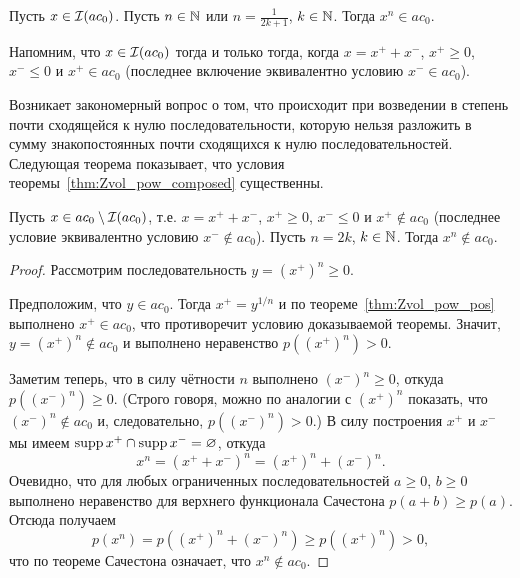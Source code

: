 \begin{theorem}
	\label{thm:Zvol_pow_composed}
	Пусть $x\in \mathcal{I}(ac_0)$.
	Пусть $n\in\mathbb{N}$ или $n = \frac1{2k+1}$, $k\in\mathbb{N}$.
	Тогда $x^n \in ac_0$.
\end{theorem}

Напомним, что $x\in \mathcal{I}(ac_0)$ тогда и только тогда, когда $x = x^+ +x^-$, $x^+\geq 0$, $x^- \leq 0$ и $x^+ \in ac_0$
(последнее включение эквивалентно условию $x^- \in ac_0$).

Возникает закономерный вопрос о том, что происходит при возведении в степень почти сходящейся к нулю последовательности,
которую нельзя разложить в сумму знакопостоянных почти сходящихся к нулю последовательностей.
Следующая теорема показывает, что условия теоремы~\ref{thm:Zvol_pow_composed} существенны.

\begin{theorem}
	\label{thm:ac0_pow_even}
	Пусть $x\in ac_0 \setminus \mathcal{I}(ac_0)$, т.е. $x = x^+ +x^-$, $x^+\geq 0$, $x^- \leq 0$ и $x^+ \notin ac_0$
	(последнее условие эквивалентно условию $x^- \notin ac_0$).
	Пусть $n = 2k$, $k\in\mathbb{N}$.
	Тогда $x^n \notin ac_0$.
\end{theorem}

\begin{proof}
	Рассмотрим последовательность $y = (x^+)^n \geq 0$.

	Предположим, что $y \in ac_0$.
	Тогда $x^+ = y^{1/n}$ и по теореме~\ref{thm:Zvol_pow_pos} выполнено $x^+\in ac_0$,
	что противоречит условию доказываемой теоремы.
	Значит, $y = (x^+)^n \notin ac_0$ и выполнено неравенство $p\left((x^+)^n\right) > 0$.

	Заметим теперь, что  в силу чётности $n$ выполнено $(x^-)^n \geq 0$, откуда $p\left((x^-)^n\right) \geq 0$.
	(Строго говоря, можно по аналогии с $(x^+)^n$ показать, что $(x^-)^n\notin ac_0$ и, следовательно, $p\left((x^-)^n\right) > 0$.)
	В силу построения $x^+$ и $x^-$ мы имеем $\operatorname{supp} x^+ \cap \operatorname{supp} x^- = \varnothing$,
	откуда
	\begin{equation}
		x^n = (x^+ + x^-)^n = (x^+)^n + (x^-)^n
		.
	\end{equation}
	Очевидно, что для любых ограниченных последовательностей $a\geq0$, $b\geq 0$ выполнено неравенство для верхнего функционала Сачестона $p(a+b) \geq p(a)$.
	Отсюда получаем
	\begin{equation}
		p(x^n) = p\left((x^+)^n + (x^-)^n\right) \geq p\left((x^+)^n\right) > 0
		,
	\end{equation}
	что по теореме Сачестона означает, что $x^n \notin ac_0$.
\end{proof}

